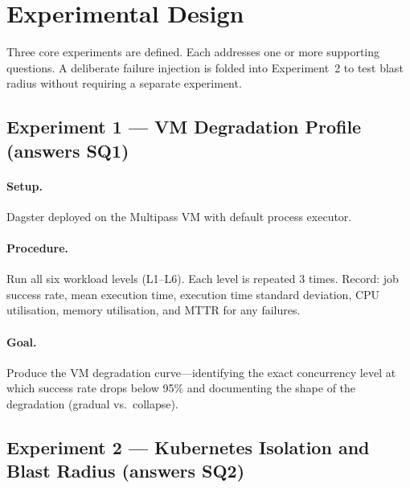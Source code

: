 
\section{Experimental Design}
\label{sec:experiments}

Three core experiments are defined. Each addresses one or more supporting questions. A deliberate failure injection is folded into Experiment~2 to test blast radius without requiring a separate experiment.

\subsection{Experiment 1 --- VM Degradation Profile (answers SQ1)}
\label{subsec:exp1}

\paragraph{Setup.} Dagster deployed on the Multipass VM with default process executor.

\paragraph{Procedure.} Run all six workload levels (L1--L6). Each level is repeated 3 times. Record: job success rate, mean execution time, execution time standard deviation, CPU utilisation, memory utilisation, and MTTR for any failures.

\paragraph{Goal.} Produce the VM degradation curve---identifying the exact concurrency level at which success rate drops below 95\% and documenting the shape of the degradation (gradual vs.\ collapse).

\subsection{Experiment 2 --- Kubernetes Isolation and Blast Radius (answers SQ2)}
\label{subsec:exp2}

